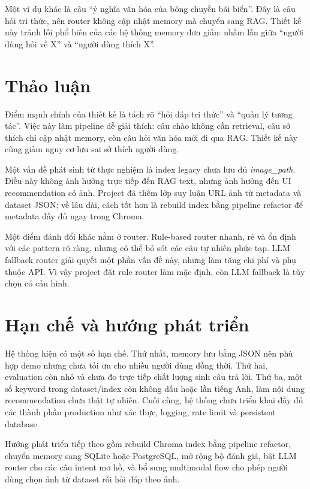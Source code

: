 \documentclass[11pt]{article}
\begin{document}
Một ví dụ khác là câu ``ý nghĩa văn hóa của bóng chuyền bãi biển''. Đây là câu hỏi tri thức, nên router không cập nhật memory mà chuyển sang RAG. Thiết kế này tránh lỗi phổ biến của các hệ thống memory đơn giản: nhầm lẫn giữa ``người dùng hỏi về X'' và ``người dùng thích X''.

\section{Thảo luận}

Điểm mạnh chính của thiết kế là tách rõ ``hỏi đáp tri thức'' và ``quản lý tương tác''. Việc này làm pipeline dễ giải thích: câu chào không cần retrieval, câu sở thích chỉ cập nhật memory, còn câu hỏi văn hóa mới đi qua RAG. Thiết kế này cũng giảm nguy cơ lưu sai sở thích người dùng.

Một vấn đề phát sinh từ thực nghiệm là index legacy chưa lưu đủ \textit{image\_path}. Điều này không ảnh hưởng trực tiếp đến RAG text, nhưng ảnh hưởng đến UI recommendation có ảnh. Project đã thêm lớp suy luận URL ảnh từ metadata và dataset JSON; về lâu dài, cách tốt hơn là rebuild index bằng pipeline refactor để metadata đầy đủ ngay trong Chroma.

Một điểm đánh đổi khác nằm ở router. Rule-based router nhanh, rẻ và ổn định với các pattern rõ ràng, nhưng có thể bỏ sót các câu tự nhiên phức tạp. LLM fallback router giải quyết một phần vấn đề này, nhưng làm tăng chi phí và phụ thuộc API. Vì vậy project đặt rule router làm mặc định, còn LLM fallback là tùy chọn có cấu hình.

\section{Hạn chế và hướng phát triển}

Hệ thống hiện có một số hạn chế. Thứ nhất, memory lưu bằng JSON nên phù hợp demo nhưng chưa tối ưu cho nhiều người dùng đồng thời. Thứ hai, evaluation còn nhỏ và chưa đo trực tiếp chất lượng sinh câu trả lời. Thứ ba, một số keyword trong dataset/index còn không dấu hoặc lẫn tiếng Anh, làm nội dung recommendation chưa thật tự nhiên. Cuối cùng, hệ thống chưa triển khai đầy đủ các thành phần production như xác thực, logging, rate limit và persistent database.

Hướng phát triển tiếp theo gồm rebuild Chroma index bằng pipeline refactor, chuyển memory sang SQLite hoặc PostgreSQL, mở rộng bộ đánh giá, bật LLM router cho các câu intent mơ hồ, và bổ sung multimodal flow cho phép người dùng chọn ảnh từ dataset rồi hỏi đáp theo ảnh.
\end{document}
